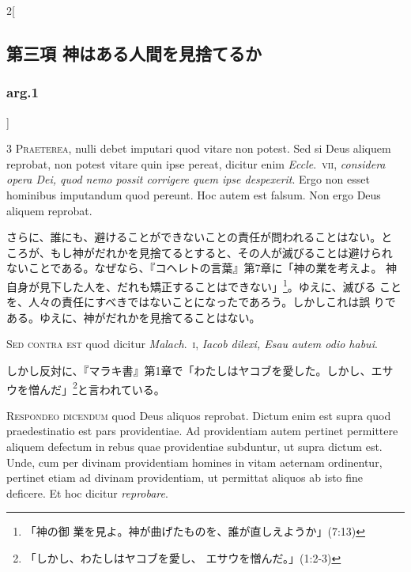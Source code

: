 \documentclass[paper=a4paper,fontsize=10pt,jafontsize=9pt,titlepage]{jlreq}
\begin{document}
\begin{paracol}{2}[\subsection{第三項 神はある人間を見捨てるか}\subsubsection{arg.1}]


{\scshape  3 Praeterea}, nulli debet imputari quod vitare
non potest. Sed si Deus aliquem reprobat, non potest vitare quin ipse
pereat, dicitur enim {\itshape Eccle}.~{\scshape vii}, {\itshape considera opera Dei, quod nemo possit
corrigere quem ipse despexerit}. Ergo non esset hominibus imputandum quod
pereunt. Hoc autem est falsum. Non ergo Deus aliquem reprobat.


\switchcolumn


さらに、誰にも、避けることができないことの責任が問われることはない。と
ころが、もし神がだれかを見捨てるとすると、その人が滅びることは避けられ
ないことである。なぜなら、『コヘレトの言葉』第7章に「神の業を考えよ。
神自身が見下した人を、だれも矯正することはできない」\footnote{「神の御
業を見よ。神が曲げたものを、誰が直しえようか」(7:13)}。ゆえに、滅びる
ことを、人々の責任にすべきではないことになったであろう。しかしこれは誤
りである。ゆえに、神がだれかを見捨てることはない。


\switchcolumn*[\subsubsection{s.c.}]


{\scshape Sed contra est} quod dicitur {\itshape Malach}.~{\scshape i},
 {\itshape Iacob dilexi, Esau autem odio habui}.


\switchcolumn


しかし反対に、『マラキ書』第1章で「わたしはヤコブを愛した。しかし、エサ
 ウを憎んだ」\footnote{「しかし、わたしはヤコブを愛し、
 エサウを憎んだ。」(1:2-3)}と言われている。




{\scshape Respondeo dicendum} quod Deus aliquos
reprobat. Dictum enim est supra quod praedestinatio est pars
providentiae. Ad providentiam autem pertinet permittere aliquem defectum
in rebus quae providentiae subduntur, ut supra dictum est. Unde, cum per
divinam providentiam homines in vitam aeternam ordinentur, pertinet
etiam ad divinam providentiam, ut permittat aliquos ab isto fine
 deficere. Et hoc dicitur {\itshape reprobare}.



\end{paracol}
\end{document}
